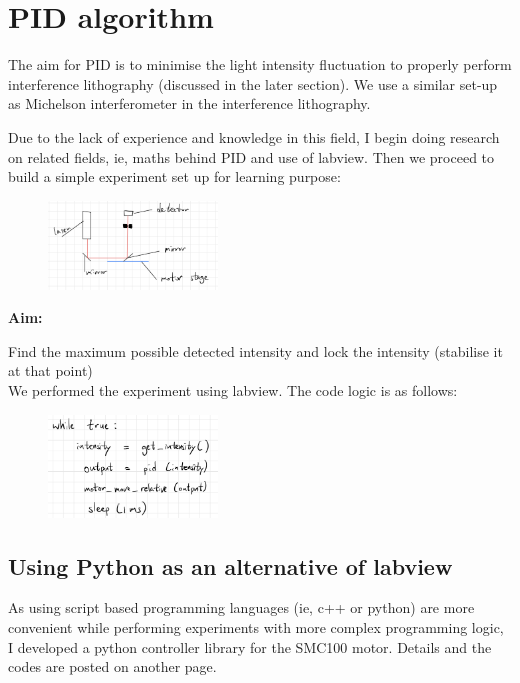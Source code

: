 \documentclass{article}
\begin{document}
\section{PID algorithm}
The aim for PID is to minimise the light intensity fluctuation to properly perform interference lithography (discussed in the later section). We use a similar set-up as Michelson interferometer in the interference lithography. 

Due to the lack of experience and knowledge in this field, I begin doing research on related fields, ie, maths behind PID and use of labview. Then we proceed to build a simple experiment set up for learning purpose:\\


\begin{figure}[H]
\centering
\includegraphics[width=0.4\textwidth,angle=0,origin=c]{pictures/IMG_B17822D656A3-1.jpeg}
\end{figure}


\textbf{Aim:}

Find the maximum possible detected intensity and lock the intensity (stabilise it at that point) \\


We performed the experiment using labview.
The code logic is as follows:\\

\begin{figure}[H]
\centering
\includegraphics[width=0.4\textwidth,angle=0,origin=c]{pictures/IMG_3248C6367539-1.jpeg}
\end{figure}

\subsection{Using Python as an alternative of labview}

As using script based programming languages (ie, c++ or python) are more convenient while performing experiments with more complex programming logic, I developed a python controller library for the SMC100 motor. Details and the codes are posted on another page.
\end{document}
